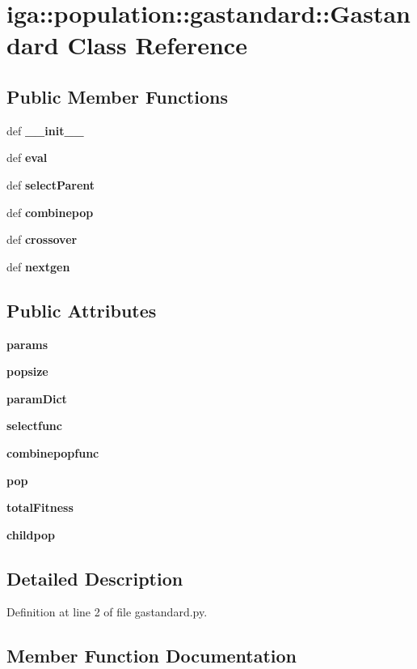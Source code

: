 \section{iga::population::gastandard::Gastandard Class Reference}
\label{classiga_1_1population_1_1gastandard_1_1Gastandard}
\subsection*{Public Member Functions}
\begin{CompactItemize}
\item 
def {\bf \_\-\_\-init\_\-\_\-}
\item 
def {\bf eval}
\item 
def {\bf selectParent}
\item 
def {\bf combinepop}
\item 
def {\bf crossover}
\item 
def {\bf nextgen}
\end{CompactItemize}
\subsection*{Public Attributes}
\begin{CompactItemize}
\item 
{\bf params}
\item 
{\bf popsize}
\item 
{\bf paramDict}
\item 
{\bf selectfunc}
\item 
{\bf combinepopfunc}
\item 
{\bf pop}
\item 
{\bf totalFitness}
\item 
{\bf childpop}
\end{CompactItemize}


\subsection{Detailed Description}


Definition at line 2 of file gastandard.py.

\subsection{Member Function Documentation}
